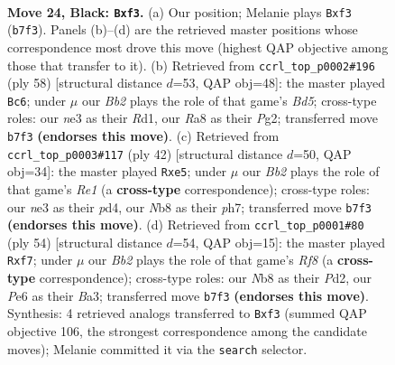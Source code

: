 \documentclass[11pt]{article}
\begin{document}
\clearpage

\begin{figure}[p]\centering
\begin{subfigure}{0.46\textwidth}\centering
\resizebox{\linewidth}{!}{%
\newchessgame
\chessboard[
  setfen={rn4k1/pb3ppp/4p3/8/7P/4NN2/PP4R1/R1K5 b - - 0 24},
  showmover=false,
  pgfstyle=straightmove, color=movearrow, markmove={b7-f3}
]}
\caption{}
\end{subfigure}\hfill
\begin{subfigure}{0.46\textwidth}\centering
\resizebox{\linewidth}{!}{%
\newchessgame
\chessboard[
  setfen={3r2k1/5ppp/3P4/p2B4/8/1P5P/r4PP1/3R2K1 w - - 0 30},
  showmover=false,
  pgfstyle=straightmove, color=movearrow, markmove={d5-c6}
]}
\caption{}
\end{subfigure}
\\[4pt]
\begin{subfigure}{0.46\textwidth}\centering
\resizebox{\linewidth}{!}{%
\newchessgame
\chessboard[
  setfen={3r2k1/5ppp/r7/4n3/3p4/8/PP3PPP/R3R1K1 w - - 0 22},
  showmover=false,
  pgfstyle=straightmove, color=movearrow, markmove={e1-e5}
]}
\caption{}
\end{subfigure}\hfill
\begin{subfigure}{0.46\textwidth}\centering
\resizebox{\linewidth}{!}{%
\newchessgame
\chessboard[
  setfen={5R2/5ppk/4p3/3r3p/3n4/BP6/3P1PPP/6K1 w - - 1 28},
  showmover=false,
  pgfstyle=straightmove, color=movearrow, markmove={f8-f7}
]}
\caption{}
\end{subfigure}
\caption{\textbf{Move 24, Black: \texttt{Bxf3}.} (a) Our position; Melanie plays \texttt{Bxf3} (\texttt{b7f3}). Panels (b)--(d) are the retrieved master positions whose correspondence most drove this move (highest QAP objective among those that transfer to it). (b) Retrieved from \texttt{ccrl\_top\_p0002\#196} (ply 58) [structural distance $d$=53, QAP obj=48]: the master played \texttt{Bc6}; under $\mu$ our \emph{Bb2} plays the role of that game's \emph{Bd5}; cross-type roles: our \emph{n}e3 as their \emph{R}d1, our \emph{R}a8 as their \emph{P}g2; transferred move \texttt{b7f3} \textbf{(endorses this move)}. (c) Retrieved from \texttt{ccrl\_top\_p0003\#117} (ply 42) [structural distance $d$=50, QAP obj=34]: the master played \texttt{Rxe5}; under $\mu$ our \emph{Bb2} plays the role of that game's \emph{Re1} (a \textbf{cross-type} correspondence); cross-type roles: our \emph{n}e3 as their \emph{p}d4, our \emph{N}b8 as their \emph{p}h7; transferred move \texttt{b7f3} \textbf{(endorses this move)}. (d) Retrieved from \texttt{ccrl\_top\_p0001\#80} (ply 54) [structural distance $d$=54, QAP obj=15]: the master played \texttt{Rxf7}; under $\mu$ our \emph{Bb2} plays the role of that game's \emph{Rf8} (a \textbf{cross-type} correspondence); cross-type roles: our \emph{N}b8 as their \emph{P}d2, our \emph{P}e6 as their \emph{B}a3; transferred move \texttt{b7f3} \textbf{(endorses this move)}. Synthesis: 4 retrieved analogs transferred to \texttt{Bxf3} (summed QAP objective 106, the strongest correspondence among the candidate moves); Melanie committed it via the \texttt{search} selector.}
\label{fig:thought-m47}
\end{figure}
\end{document}
